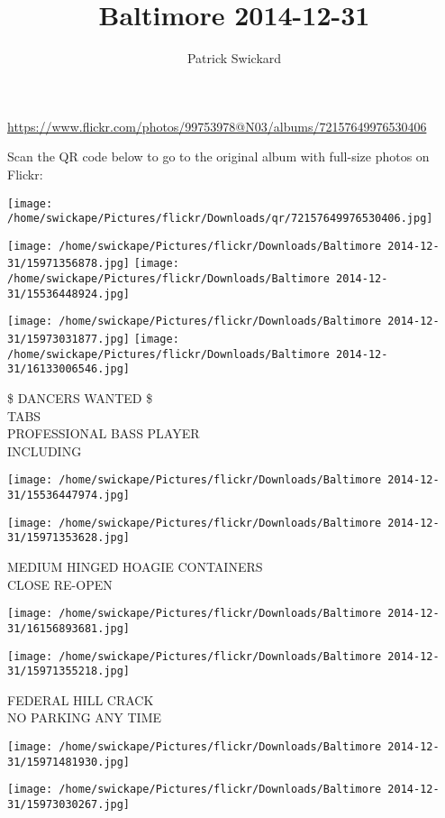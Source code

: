 \documentclass[10pt,letterpaper]{article}
\title{Baltimore 2014-12-31}
\author{Patrick Swickard}
\date{}
\begin{document}
\maketitle

\url{https://www.flickr.com/photos/99753978@N03/albums/72157649976530406}

Scan the QR code below to go to the original album with full-size photos on Flickr:

\texttt{[image: /home/swickape/Pictures/flickr/Downloads/qr/72157649976530406.jpg]}
\pagebreak

\texttt{[image: /home/swickape/Pictures/flickr/Downloads/Baltimore 2014-12-31/15971356878.jpg]}
\texttt{[image: /home/swickape/Pictures/flickr/Downloads/Baltimore 2014-12-31/15536448924.jpg]}

\texttt{[image: /home/swickape/Pictures/flickr/Downloads/Baltimore 2014-12-31/15973031877.jpg]}
\texttt{[image: /home/swickape/Pictures/flickr/Downloads/Baltimore 2014-12-31/16133006546.jpg]}

\$ DANCERS WANTED \$\\
TABS\\
PROFESSIONAL BASS PLAYER\\
INCLUDING
\pagebreak

\texttt{[image: /home/swickape/Pictures/flickr/Downloads/Baltimore 2014-12-31/15536447974.jpg]}

\vspace{0.25in}
\texttt{[image: /home/swickape/Pictures/flickr/Downloads/Baltimore 2014-12-31/15971353628.jpg]}

MEDIUM HINGED HOAGIE CONTAINERS\\
CLOSE RE{-}OPEN
\pagebreak

\texttt{[image: /home/swickape/Pictures/flickr/Downloads/Baltimore 2014-12-31/16156893681.jpg]}

\vspace{0.25in}
\texttt{[image: /home/swickape/Pictures/flickr/Downloads/Baltimore 2014-12-31/15971355218.jpg]}

FEDERAL HILL CRACK\\
NO PARKING ANY TIME
\pagebreak

\texttt{[image: /home/swickape/Pictures/flickr/Downloads/Baltimore 2014-12-31/15971481930.jpg]}

\vspace{0.25in}
\texttt{[image: /home/swickape/Pictures/flickr/Downloads/Baltimore 2014-12-31/15973030267.jpg]}
\end{document}
